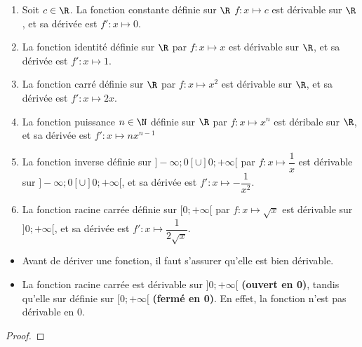 \documentclass{article}
\begin{document}
\begin{tcolorbox}
\begin{proposition}
\hfill
\begin{enumerate}
\item Soit $c \in \R$. La fonction constante définie sur $\R$ $f : x \mapsto c$ est dérivable sur $\R$, et sa dérivée est $f' : x \mapsto 0$.
\item La fonction identité définie sur $\R$ par $f : x \mapsto x$ est dérivable sur $\R$, et sa dérivée est $f' : x \mapsto 1$.
\item La fonction carré définie sur $\R$ par $f : x \mapsto x^2$ est dérivable sur $\R$, et sa dérivée est $f' : x \mapsto 2x$.
\item La fonction puissance $n \in \N$ définie sur $\R$ par $f : x \mapsto x^n$ est déribale sur $\R$, et sa dérivée est $f' : x \mapsto nx^{n-1}$
\item La fonction inverse définie sur $]-\infty;0[\cup]0;+\infty[$ par $f : x \mapsto \dfrac{1}{x}$ est dérivable sur $]-\infty;0[\cup]0;+\infty[$, et sa dérivée est $f' : x \mapsto -\dfrac{1}{x^2}$.
\item La fonction racine carrée définie sur $[0;+\infty[$ par $f : x \mapsto \sqrt{x}$ est dérivable sur $]0;+\infty[$, et sa dérivée est $f' : x \mapsto \dfrac{1}{2\sqrt{x}}$.
\end{enumerate}
\end{proposition}
\end{tcolorbox}
\begin{remark}
\hfill
\begin{itemize}
\item Avant de dériver une fonction, il faut s'assurer qu'elle est bien dérivable.
\item La fonction racine carrée est dérivable sur $]0;+\infty[$ \textbf{(ouvert en 0)}, tandis qu'elle sur définie sur $[0;+\infty[$ \textbf{(fermé en 0)}. En effet, la fonction n'est pas dérivable en $0$.
\end{itemize}
\end{remark}
\begin{proof}
\hfill

\vspace*{0.2cm}
\emptybox{10cm}
\end{proof}
\newpage
\end{document}
